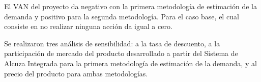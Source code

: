 El VAN del proyecto da negativo con la primera metodología de estimación de la demanda y positivo para la segunda metodología. Para el caso base, el cual consiste en no realizar ninguna acción da igual a cero.

Se realizaron tres análisis de sensibilidad: a la tasa de descuento, a la participación de mercado del producto desarrollado a partir del Sistema de Alcuza Integrada para la primera metodología de estimación de la demanda, y al precio del producto para ambas metodologías.
